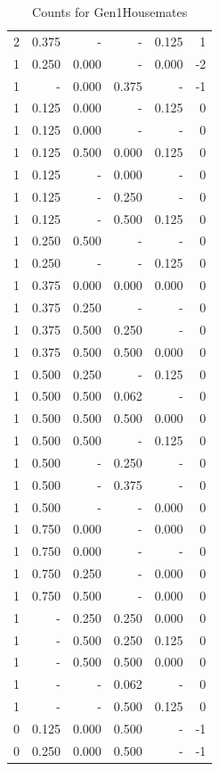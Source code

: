 \documentclass[a4paper]{article}\usepackage[]{graphicx}\usepackage[]{color}
\begin{document}
\begin{table}[ht]
\begin{tabular}{rrrrrr}
   \rowcolor{nullColor} 2 & 0.375 & - & - & 0.125 & 1 \\ 
  1 & 0.250 & 0.000 & - & 0.000 & -2 \\ 
   \rowcolor{badColor} 1 & - & 0.000 & 0.375 & - & -1 \\ 
  1 & 0.125 & 0.000 & - & 0.125 & 0 \\ 
  1 & 0.125 & 0.000 & - & - & 0 \\ 
   \rowcolor{badColor} 1 & 0.125 & 0.500 & 0.000 & 0.125 & 0 \\ 
   \rowcolor{sosoColor} 1 & 0.125 & - & 0.000 & - & 0 \\ 
   \rowcolor{sosoColor} 1 & 0.125 & - & 0.250 & - & 0 \\ 
   \rowcolor{sosoColor} 1 & 0.125 & - & 0.500 & 0.125 & 0 \\ 
  1 & 0.250 & 0.500 & - & - & 0 \\ 
   \rowcolor{nullColor} 1 & 0.250 & - & - & 0.125 & 0 \\ 
   \rowcolor{goodColor} 1 & 0.375 & 0.000 & 0.000 & 0.000 & 0 \\ 
  1 & 0.375 & 0.250 & - & - & 0 \\ 
   \rowcolor{badColor} 1 & 0.375 & 0.500 & 0.250 & - & 0 \\ 
   \rowcolor{goodColor} 1 & 0.375 & 0.500 & 0.500 & 0.000 & 0 \\ 
  1 & 0.500 & 0.250 & - & 0.125 & 0 \\ 
   \rowcolor{badColor} 1 & 0.500 & 0.500 & 0.062 & - & 0 \\ 
   \rowcolor{goodColor} 1 & 0.500 & 0.500 & 0.500 & 0.000 & 0 \\ 
  1 & 0.500 & 0.500 & - & 0.125 & 0 \\ 
   \rowcolor{sosoColor} 1 & 0.500 & - & 0.250 & - & 0 \\ 
   \rowcolor{sosoColor} 1 & 0.500 & - & 0.375 & - & 0 \\ 
   \rowcolor{nullColor} 1 & 0.500 & - & - & 0.000 & 0 \\ 
  1 & 0.750 & 0.000 & - & 0.000 & 0 \\ 
  1 & 0.750 & 0.000 & - & - & 0 \\ 
  1 & 0.750 & 0.250 & - & 0.000 & 0 \\ 
  1 & 0.750 & 0.500 & - & 0.000 & 0 \\ 
   \rowcolor{goodColor} 1 & - & 0.250 & 0.250 & 0.000 & 0 \\ 
   \rowcolor{badColor} 1 & - & 0.500 & 0.250 & 0.125 & 0 \\ 
   \rowcolor{goodColor} 1 & - & 0.500 & 0.500 & 0.000 & 0 \\ 
   \rowcolor{sosoColor} 1 & - & - & 0.062 & - & 0 \\ 
   \rowcolor{sosoColor} 1 & - & - & 0.500 & 0.125 & 0 \\ 
   \rowcolor{badColor} 0 & 0.125 & 0.000 & 0.500 & - & -1 \\ 
   \rowcolor{badColor} 0 & 0.250 & 0.000 & 0.500 & - & -1 \\ 
   \hline
\end{tabular}
\caption{Counts for Gen1Housemates} 
\end{table}
\end{document}
